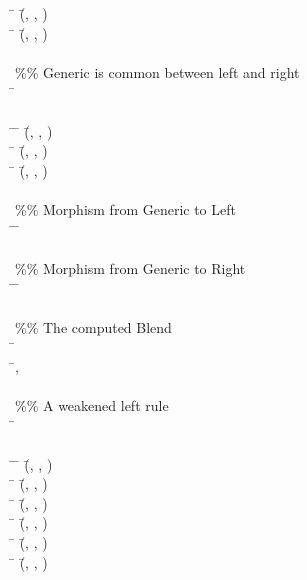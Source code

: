 \documentclass{AISB2008}
\begin{document}
\begin{listing}
{\begin{hetcasl}
\> \Ax{\bullet} \= (\=, , ) \Ax{=} \\
\> \Ax{\bullet} \= (\=, , ) \Ax{=} \\
\\
\%\% Generic is common between left and right\\
\SPEC \= \Ax{=}\\
\> \\
\THEN \=\Ax{\bullet} \= (\=, , ) \Ax{=} \\
\> \Ax{\bullet} \= (\=, , ) \Ax{=} \\
\> \Ax{\bullet} \= (\=, , ) \Ax{=} \\
\\
\%\% Morphism from Generic to Left\\
\VIEW \= \Ax{:} \=  \\
\\
\%\% Morphism from Generic to Right\\
\VIEW \= \Ax{:} \=  \\
\\
\%\% The computed Blend\\
\SPEC \= \Ax{=}\\
\>  \=, \\
\\
\%\% A weakened left rule\\
\SPEC \= \Ax{=}\\
\> \\
\THEN \=\Ax{\bullet} \= (\=, , ) \Ax{=} \\
\> \Ax{\bullet} \= (\=, , ) \Ax{=} \\
\> \Ax{\bullet} \= (\=, , ) \Ax{=} \\
\> \Ax{\bullet} \= (\=, , ) \Ax{=} \\
\> \Ax{\bullet} \= (\=, , ) \Ax{=} \\
\> \Ax{\bullet} \= (\=, , ) \Ax{=} \\

\end{hetcasl}}
\end{listing}
\end{document}
